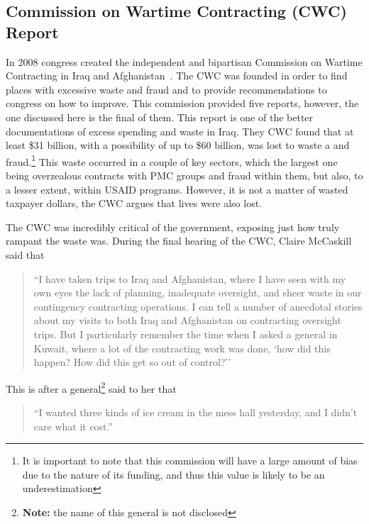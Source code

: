 \documentclass[12pt]{article}
\begin{document}
    \subsection{Commission on Wartime Contracting (CWC) Report}
        In 2008 congress created the independent and bipartisan Commission on Wartime Contracting in Iraq and Afghanistan~\parencite{CWC_2011}. The CWC was founded in order to find places with excessive waste and fraud and to provide recommendations to congress on how to improve. This commission provided five reports, however, the one discussed here is the final of them. This report is one of the better documentations of excess spending and waste in Iraq. They CWC found that at least \$31 billion, with a possibility of up to \$60 billion, was lost to waste a and fraud.\footnote{It is important to note that this commission will have a large amount of bias due to the nature of its funding, and thus this value is likely to be an underestimation} 
        This waste occurred in a couple of key sectors, which the largest one being overzealous contracts with PMC groups and fraud within them, but also, to a lesser extent, within USAID programs. However, it is not a matter of wasted taxpayer dollars, the CWC argues that lives were also lost. 
        
        The CWC was incredibly critical of the government, exposing just how truly rampant the waste was. During the final hearing of the CWC, Claire McCaskill said that 
        
        \begin{quote}
            ``I have taken trips to Iraq and Afghanistan, where I have seen with my own eyes the lack of planning, inadequate oversight, and sheer waste in our contingency contracting operations. I can tell a number of anecdotal stories about my visits to both Iraq and Afghanistan on contracting oversight trips. But I particularly remember the time when I asked a general in Kuwait, where a lot of the contracting work was done, `how did this happen? How did this get so out of control?''~\parencite{us_senate2011wartime_contracting}
        \end{quote}

        This is after a general\footnote{\textbf{Note:} the name of this general is not disclosed} said to her that 

        \begin{quote}
            ``I wanted three kinds of ice cream in the mess hall yesterday, and I didn't care what it cost.''~\parencite{us_senate2011wartime_contracting}
        \end{quote}
\end{document}
